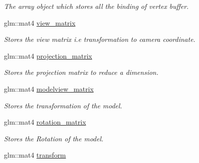 \begin{DoxyCompactItemize}
\begin{DoxyCompactList}\small\item\em The array object which stores all the binding of vertex buffer. \end{DoxyCompactList}\item 
glm\+::mat4 \hyperlink{classcft_1_1Model_aed40a6c3ab633a2de87f066d7e2ed5ce}{view\+\_\+matrix}\hypertarget{classcft_1_1Model_aed40a6c3ab633a2de87f066d7e2ed5ce}{}\label{classcft_1_1Model_aed40a6c3ab633a2de87f066d7e2ed5ce}

\begin{DoxyCompactList}\small\item\em Stores the view matrix i.\+e transformation to camera coordinate. \end{DoxyCompactList}\item 
glm\+::mat4 \hyperlink{classcft_1_1Model_a89377ec3e5c9d2840323b09ad7d32fc6}{projection\+\_\+matrix}\hypertarget{classcft_1_1Model_a89377ec3e5c9d2840323b09ad7d32fc6}{}\label{classcft_1_1Model_a89377ec3e5c9d2840323b09ad7d32fc6}

\begin{DoxyCompactList}\small\item\em Stores the projection matrix to reduce a dimension. \end{DoxyCompactList}\item 
glm\+::mat4 \hyperlink{classcft_1_1Model_a67e3c1d4c9db01015040d279c82ea08a}{modelview\+\_\+matrix}\hypertarget{classcft_1_1Model_a67e3c1d4c9db01015040d279c82ea08a}{}\label{classcft_1_1Model_a67e3c1d4c9db01015040d279c82ea08a}

\begin{DoxyCompactList}\small\item\em Stores the transformation of the model. \end{DoxyCompactList}\item 
glm\+::mat4 \hyperlink{classcft_1_1Model_ae734ccf60224cd323840ad561639110b}{rotation\+\_\+matrix}\hypertarget{classcft_1_1Model_ae734ccf60224cd323840ad561639110b}{}\label{classcft_1_1Model_ae734ccf60224cd323840ad561639110b}

\begin{DoxyCompactList}\small\item\em Stores the Rotation of the model. \end{DoxyCompactList}\item 
glm\+::mat4 \hyperlink{classcft_1_1Model_a13fdbe9081361f1cb953e3732e45045a}{transform}\hypertarget{classcft_1_1Model_a13fdbe9081361f1cb953e3732e45045a}{}\label{classcft_1_1Model_a13fdbe9081361f1cb953e3732e45045a}


\end{DoxyCompactItemize}
